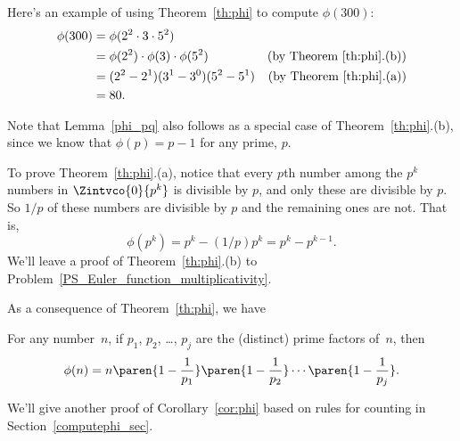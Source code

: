 Here's an example of using Theorem~\ref{th:phi} to compute $\phi(300)$:
\begin{align*}
\phi(300) & = \phi(2^2 \cdot 3 \cdot 5^2)\\
& = \phi(2^2) \cdot \phi(3) \cdot \phi(5^2) &
\text{(by Theorem~\ref{th:phi}.(b))}\\
& = (2^2 - 2^1) (3^1 - 3^0) (5^2 - 5^1) & \text{(by
  Theorem~\ref{th:phi}.(a))}\\
& = 80.
\end{align*}

Note that Lemma~\ref{phi_pq} also follows as a special case of
Theorem~\ref{th:phi}.(b), since we know that $\phi(p) = p-1$ for any
prime, $p$.

To prove Theorem~\ref{th:phi}.(a), notice that every $p$th number among the $p^k$ numbers
in $\Zintvco{0}{p^{k}}$ is divisible by $p$, and only these are divisible by $p$.  So $1/p$ of
  these numbers are divisible by $p$ and the remaining ones are not.  That is,
\[
\phi(p^{k}) = p^k - (1/p)p^k = p^k -p^{k-1}.
\]
We'll leave a proof of Theorem~\ref{th:phi}.(b) to
Problem~\ref{PS_Euler_function_multiplicativity}.

As a consequence of Theorem~\ref{th:phi}, we have
\begin{corollary}\label{cor:phi}
For any number~$n$, if $p_1$, $p_2$, \dots, $p_j$ are the (distinct)
prime factors of~$n$, then
\begin{equation*}
    \phi(n) = n \paren{1 - \frac{1}{p_1}} \paren{1 - \frac{1}{p_2}} \cdots \paren{1 -
      \frac{1}{p_j}}.
 \end{equation*}
\end{corollary}
We'll give another proof of Corollary~\ref{cor:phi} based on rules for
counting in Section~\ref{computephi_sec}.

\iffalse are all those of the form $mp$.  For $mp$ to be in the interval, $m$ can take any
value from 0 to $p^{k-1}-1$ and no others, so there are exactly $p^{k-1}$ numbers in the
interval that are divisible by $p$.  Now $\phi(p^{k})$ equals the number of remaining
elements in the interval, namely, $p^k -p^{k-1}$.  \fi

